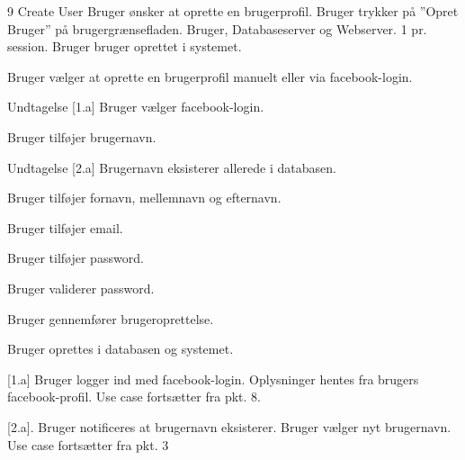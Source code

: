 
\uchead
	{9}
	{Create User}
	{Bruger ønsker at oprette en brugerprofil.}
	{Bruger trykker på ''Opret Bruger'' på brugergrænsefladen.}
	{Bruger, Databaseserver og Webserver.}
	{}
	{1 pr. session.}
	{Bruger bruger oprettet i systemet.}

\item Bruger vælger at oprette en brugerprofil manuelt eller via facebook-login.

\item Undtagelse [1.a] Bruger vælger facebook-login.

\item Bruger tilføjer brugernavn.

\item Undtagelse [2.a] Brugernavn eksisterer allerede i databasen.

\item Bruger tilføjer fornavn, mellemnavn og efternavn.

\item Bruger tilføjer email.

\item Bruger tilføjer password.

\item Bruger validerer password.

\item Bruger gennemfører brugeroprettelse.

\item Bruger oprettes i databasen og systemet.

\ucdescriptionend

\ucextension
	{[1.a]}
	{Bruger logger ind med facebook-login.}
	{Oplysninger hentes fra brugers facebook-profil.}
	{Use case fortsætter fra pkt. 8.}
	
\ucextension
	{[2.a].}
	{Bruger notificeres at brugernavn eksisterer.}
	{Bruger vælger nyt brugernavn.}
	{Use case fortsætter fra pkt. 3}
		